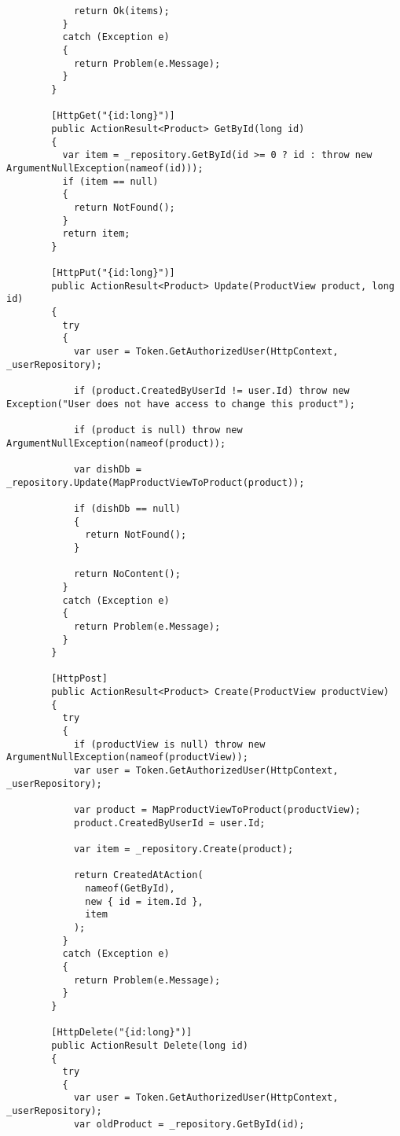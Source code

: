 \begin{lstlisting}
            return Ok(items);
          }
          catch (Exception e)
          {
            return Problem(e.Message);
          }
        }
    
        [HttpGet("{id:long}")]
        public ActionResult<Product> GetById(long id)
        {
          var item = _repository.GetById(id >= 0 ? id : throw new ArgumentNullException(nameof(id)));
          if (item == null)
          {
            return NotFound();
          }
          return item;
        }
    
        [HttpPut("{id:long}")]
        public ActionResult<Product> Update(ProductView product, long id)
        {
          try
          {
            var user = Token.GetAuthorizedUser(HttpContext, _userRepository);
    
            if (product.CreatedByUserId != user.Id) throw new Exception("User does not have access to change this product");
            
            if (product is null) throw new ArgumentNullException(nameof(product));
            
            var dishDb = _repository.Update(MapProductViewToProduct(product));
            
            if (dishDb == null)
            {
              return NotFound();
            }
    
            return NoContent();
          }
          catch (Exception e)
          {
            return Problem(e.Message);
          }
        }
    
        [HttpPost]
        public ActionResult<Product> Create(ProductView productView)
        {
          try
          {
            if (productView is null) throw new ArgumentNullException(nameof(productView));
            var user = Token.GetAuthorizedUser(HttpContext, _userRepository);
    
            var product = MapProductViewToProduct(productView);
            product.CreatedByUserId = user.Id;
            
            var item = _repository.Create(product);
    
            return CreatedAtAction(
              nameof(GetById),
              new { id = item.Id },
              item
            );
          }
          catch (Exception e)
          {
            return Problem(e.Message);
          }
        }
    
        [HttpDelete("{id:long}")]
        public ActionResult Delete(long id)
        {
          try
          {
            var user = Token.GetAuthorizedUser(HttpContext, _userRepository);
            var oldProduct = _repository.GetById(id);
    

\end{lstlisting}
